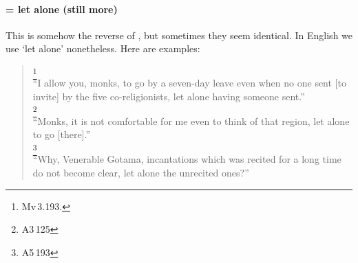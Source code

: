 \paragraph*{ = let alone (still more)} This is somehow the reverse of , but sometimes they seem identical. In English we use `let alone' nonetheless. Here are examples:

\begin{quote}
\footnote{Mv\,3.193.}\\
``I allow you, monks, to go by a seven-day leave even when no one sent [to invite] by the five co-religionists, let alone having someone sent.''\\[1.5mm]
\footnote{A3\,125}\\
``Monks, it is not comfortable for me even to think of that region, let alone to go [there].''\\[1.5mm]
\footnote{A5\,193}\\
``Why, Venerable Gotama, incantations which was recited for a long time do not become clear, let alone the unrecited ones?''\\[1.5mm]
\end{quote}

